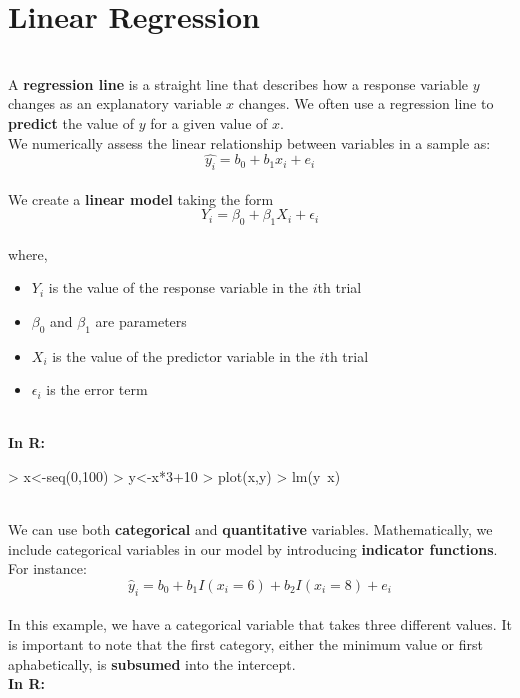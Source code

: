 \documentclass{article}
\begin{document}
\section{Linear Regression}
  \\ A \textbf{regression line} is a straight line that describes how a response variable $y$ changes as an explanatory variable $x$ changes. We often use a regression line to \textbf{predict} the value of $y$ for a given value of $x$. 
  \\ We numerically assess the linear relationship between variables in a sample as:
  $$\hat{y_i}=b_0+b_1x_i+e_i$$
  \\ We create a \textbf{linear model} taking the form
  $$Y_i=\beta_0+\beta_1 X_i+\epsilon_i$$
  \\where,
  \begin{itemize}
    \item $Y_i$ is the value of the response variable in the $i$th trial
    \item $\beta_0$ and $\beta_1$ are parameters
    \item $X_i$ is the value of the predictor variable in the $i$th trial
    \item $\epsilon_i$ is the error term
  \end{itemize}
  \\ \textbf{In R:}
\begin{Schunk}
\begin{Sinput}
> x<-seq(0,100)
> y<-x*3+10
> plot(x,y)
> lm(y~x)
\end{Sinput}
\end{Schunk}
  \\ We can use both \textbf{categorical} and \textbf{quantitative} variables. Mathematically, we include categorical variables in our model by introducing \textbf{indicator functions}. For instance:
  $$\hat{y}_i=b_0+b_1I(x_i=6)+b_2I(x_i=8)+e_i$$
  \\ In this example, we have a categorical variable that takes three different values. It is important to note that the first category, either the minimum value or first aphabetically, is \textbf{subsumed} into the intercept.
  \\ \textbf{In R:}
\begin{Schunk}
\end{Schunk}
\end{document}
